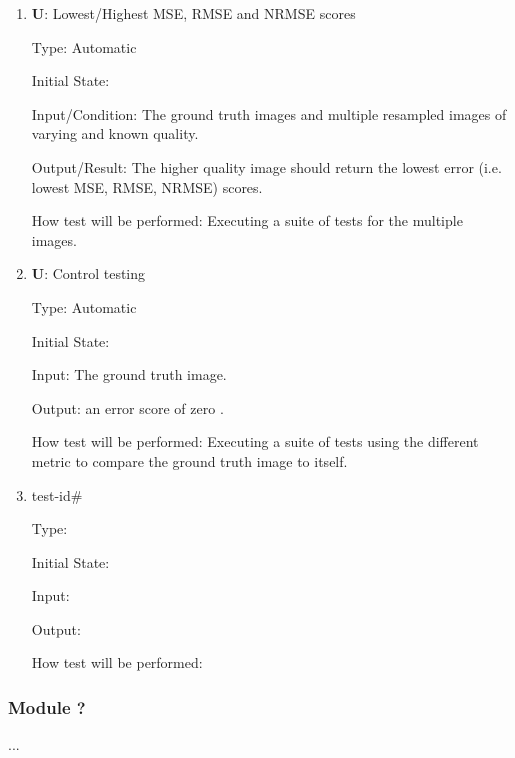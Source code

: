 \documentclass[12pt, titlepage]{article}
\newcounter{testnum} %
\newcounter{unittestnum} %
\begin{document}
\begin{enumerate}

\item{\textbf{U\theunittestnum \label{U_metric1}}: Lowest/Highest MSE, RMSE and NRMSE scores\\}

Type: Automatic
					
Initial State: 
					
Input/Condition: The ground truth images and multiple resampled images of varying and known quality.
					
Output/Result: The higher quality image should return the lowest error (i.e. lowest MSE, RMSE, NRMSE) scores.
					
How test will be performed: Executing a suite of tests for the multiple images.
					
\item{\textbf{U\theunittestnum \label{U_metricControl}}: Control testing \\}

Type: Automatic
					
Initial State: 
					
Input: The ground truth image.
					
Output: an error score of zero .
					
How test will be performed: Executing a suite of tests using the different metric to compare the 
ground truth image to itself.
					
\item{test-id\#\\}

Type: 
					
Initial State: 
					
Input: 
					
Output: 
					
How test will be performed: 

\end{enumerate}

\subsubsection{Module ?}

...

\newpage
\clearpage
\end{document}
